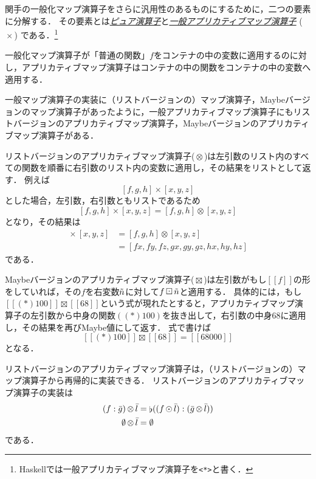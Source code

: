 \documentclass[twocolumn]{jsbook}
\def\[{[\![}
\def\]{]\!]}
\newcommand{\keyword}[1]{\underline{\emph{#1}}}
\newcommand{\code}[1]{\texttt{#1}}
\DeclareMathOperator{\hsklApplicativeMap}{\times}
\DeclareMathOperator{\hsklApplicativeListMap}{\otimes}
\DeclareMathOperator{\hsklApplicativeMaybeMap}{\boxtimes}
\DeclareMathOperator{\hsklConcat}{\flat}
\DeclareMathOperator{\hsklMap}{\odot}
\DeclareMathOperator{\hsklMaybeMap}{\boxdot}
\newcommand{\hsklEmptyList}{\emptyset}
\newcommand{\hsklJust}[1]{\[#1\]}
\newcommand{\hsklList}[1]{\Bar{#1}}
\newcommand{\hsklMaybe}[1]{\Tilde{#1}}
\begin{document}
関手の一般化マップ演算子をさらに汎用性のあるものにするために，二つの要素に分解する．
その要素とは\keyword{ピュア演算子}と\keyword{一般アプリカティブマップ演算子} ($\hsklApplicativeMap$) である．\footnote{Haskellでは一般アプリカティブマップ演算子を\code{<*>}と書く．}

一般化マップ演算子が「普通の関数」$f$をコンテナの中の変数に適用するのに対し，アプリカティブマップ演算子はコンテナの中の関数をコンテナの中の変数へ適用する．

一般マップ演算子の実装に（リストバージョンの）マップ演算子，Maybeバージョンのマップ演算子があったように，一般アプリカティブマップ演算子にもリストバージョンのアプリカティブマップ演算子，Maybeバージョンのアプリカティブマップ演算子がある．

リストバージョンのアプリカティブマップ演算子($\hsklApplicativeListMap$)は左引数のリスト内のすべての関数を順番に右引数のリスト内の変数に適用し，その結果をリストとして返す．
例えば$$[f,g,h]\hsklApplicativeMap[x,y,z]$$とした場合，左引数，右引数ともリストであるため$$[f,g,h]\hsklApplicativeMap[x,y,z]=[f,g,h]\hsklApplicativeListMap[x,y,z]$$となり，その結果は
\begin{align*}
[f,g,h]\hsklApplicativeMap[x,y,z]&=[f,g,h]\hsklApplicativeListMap[x,y,z]\\
&=[fx,fy,fz,gx,gy,gz,hx,hy,hz]
\end{align*}
である．

Maybeバージョンのアプリカティブマップ演算子($\hsklApplicativeMaybeMap$)は左引数がもし$\hsklJust{f}$の形をしていれば，その$f$を右変数$\hsklMaybe{n}$に対して$f\hsklMaybeMap\hsklMaybe{n}$と適用する．
具体的には，もし$\hsklJust{(*)100}\hsklApplicativeMaybeMap{}\hsklJust{68}$という式が現れたとすると，アプリカティブマップ演算子の左引数から中身の関数$((*)100)$を抜き出して，右引数の中身$68$に適用し，その結果を再びMaybe値にして返す．
式で書けば
$$\hsklJust{(*)100}\hsklApplicativeMaybeMap{}\hsklJust{68}=\hsklJust{68000}$$
となる．

リストバージョンのアプリカティブマップ演算子は，（リストバージョンの）マップ演算子から再帰的に実装できる．
リストバージョンのアプリカティブマップ演算子の実装は
\begin{align*}
(f:\hsklList{g})\hsklApplicativeListMap\hsklList{l}&=\hsklConcat((f\hsklMap\hsklList{l}):(\hsklList{g}\hsklApplicativeListMap\hsklList{l}))\\
\hsklEmptyList\hsklApplicativeListMap\hsklList{l}&=\hsklEmptyList
\end{align*}
である．
\end{document}

